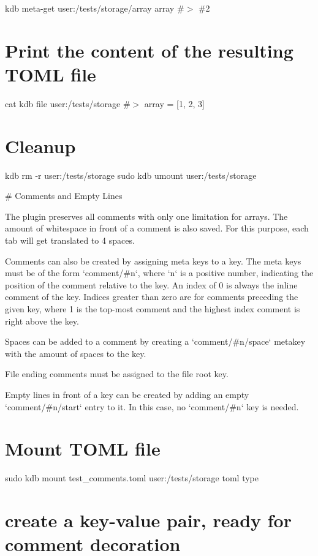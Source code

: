 kdb meta-\/get \textquotesingle{}user\+:/tests/storage/array\textquotesingle{} \textquotesingle{}array\textquotesingle{} \#$>$ \#2\hypertarget{autotoc_md635_autotoc_md718}{}\section{Print the content of the resulting T\+O\+M\+L file}\label{autotoc_md635_autotoc_md718}
cat {\ttfamily kdb file user\+:/tests/storage} \#$>$ array = \mbox{[}1, 2, 3\mbox{]}\hypertarget{autotoc_md635_autotoc_md719}{}\section{Cleanup}\label{autotoc_md635_autotoc_md719}
kdb rm -\/r user\+:/tests/storage sudo kdb umount user\+:/tests/storage 
\begin{DoxyCode}
# Comments and Empty Lines

The plugin preserves all comments with only one limitation for arrays. The amount of whitespace in front of
       a comment is also saved.
For this purpose, each tab will get translated to 4 spaces.

Comments can also be created by assigning meta keys to a key.
The meta keys must be of the form `comment/#n`, where `n` is a positive number, indicating the position of
       the comment relative to the key.
An index of 0 is always the inline comment of the key.
Indices greater than zero are for comments preceding the given key, where 1 is the top-most comment and the
       highest index comment is right above the key.

Spaces can be added to a comment by creating a `comment/#n/space` metakey with the amount of spaces to the
       key.

File ending comments must be assigned to the file root key.

Empty lines in front of a key can be created by adding an empty `comment/#n/start` entry to it. In this
       case, no `comment/#n` key is needed.
\end{DoxyCode}
 \hypertarget{autotoc_md635_autotoc_md720}{}\section{Mount T\+O\+M\+L file}\label{autotoc_md635_autotoc_md720}
sudo kdb mount test\+\_\+comments.\+toml user\+:/tests/storage toml type\hypertarget{autotoc_md635_autotoc_md721}{}\section{create a key-\/value pair, ready for comment decoration}\label{autotoc_md635_autotoc_md721}
